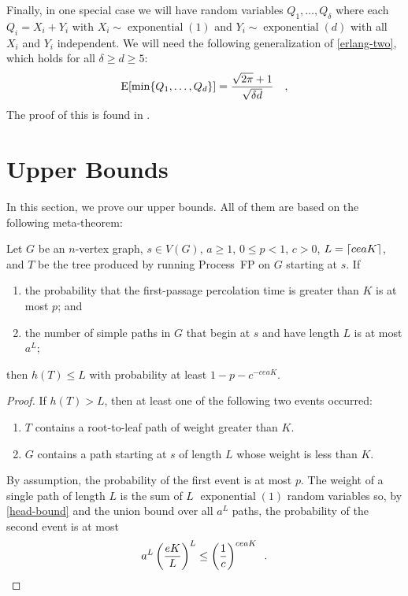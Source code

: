 \documentclass[lotsofwhite]{patmorin}
\DeclareMathOperator{\exponential}{exponential}
\begin{document}
Finally, in one special case we will have random variables
$Q_1,\ldots,Q_\delta$ where each $Q_i=X_i+Y_i$ with $X_i\sim\exponential(1)$
and $Y_i\sim\exponential(d)$ with all $X_i$ and $Y_i$ independent.  We will need the following generalization of
\eqref{erlang-two}, which holds for all $\delta \ge d \ge 5$:
\begin{equation}
   \E[\min\{Q_1,\ldots,Q_d\}] = \frac{\sqrt{2\pi}+1}{\sqrt{\delta d}}
     \enspace \enspace ,
     \eqlabel{non-uniform-erlang}
\end{equation}
The proof of this is found in .



\section{Upper Bounds}

In this section, we prove our upper bounds. All of them are based on
the following meta-theorem:

\begin{lem}
   Let $G$ be an $n$-vertex graph, $s\in V(G)$, $a\ge 1$, $0\le p<1$, $c>0$, 
   $L={\lceil ceaK \rceil}$, and $T$ be the tree produced by running Process~FP
   on $G$ starting at $s$.  If 
   \begin{enumerate}
      \item the probability that the first-passage percolation time is greater than $K$ is at most $p$; and

      \item the number of simple paths in $G$ that begin at $s$ and have
        length $L$ is at most $a^L$;
   \end{enumerate}
   then $h(T) \le L$ with probability at least $1-p-c^{-ceaK}$.
\end{lem}

\begin{proof}
   If $h(T)> L$, then at least one of the following two events occurred:
   \begin{enumerate}
     \item $T$ contains a root-to-leaf path of weight greater than $K$.
     \item $G$ contains a path starting at $s$ of length $L$ whose weight 
        is less than $K$.
   \end{enumerate}
   By assumption, the probability of the first event is at most $p$.  
   The weight of a single path of length $L$ is the sum of $L$ $\exponential(1)$
   random variables so, by \eqref{head-bound} and the union bound over
   all $a^L$ paths, the probability of the second event is at most
   \[
       a^L \left(\frac{eK}{L} \right)^L \le \left(\frac{1}{c}\right)^{ceaK}
       \enspace . \qedhere
   \]
\end{proof}
\end{document}
